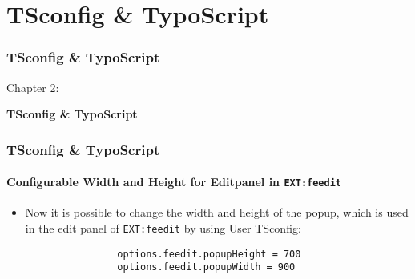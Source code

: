 %

\section{TSconfig \& TypoScript}
\begin{frame}[fragile]
	\frametitle{TSconfig \& TypoScript}

	\begin{center}\huge{Chapter 2:}\end{center}
	\begin{center}\huge{\color{typo3darkgrey}\textbf{TSconfig \& TypoScript}}\end{center}

\end{frame}


\begin{frame}[fragile]
	\frametitle{TSconfig \& TypoScript}
	\framesubtitle{Configurable Width and Height for Editpanel in \texttt{EXT:feedit}}

	\lstset{basicstyle=\small\ttfamily}

	\begin{itemize}

		\item Now it is possible to change the width and height of the popup, which is used in the
			edit panel of \texttt{EXT:feedit} by using User TSconfig:
			\begin{lstlisting}
				options.feedit.popupHeight = 700
				options.feedit.popupWidth = 900
			\end{lstlisting}

	\end{itemize}

\end{frame}

